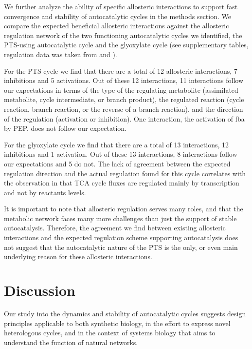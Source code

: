     We further analyze the ability of specific allosteric interactions to support fast convergence and stability of autocatalytic cycles in the methods section.
    We compare the expected beneficial allosteric interactions against the allosteric regulation network of the two functioning autocatalytic cycles we identified, the PTS-using autocatalytic cycle and the glyoxylate cycle (see supplementary tables, regulation data was taken from \cite{Keseler2013-xn} and \cite{Schomburg2004-st}).

    For the PTS cycle we find that there are a total of 12 allosteric interactions, 7 inhibitions and 5 activations.
    Out of these 12 interactions, 11 interactions follow our expectations in terms of the type of the regulating metabolite (assimilated metabolite, cycle intermediate, or branch product), the regulated reaction (cycle reaction, branch reaction, or the reverse of a branch reaction), and the direction of the regulation (activation or inhibition).
    One interaction, the activation of fba by PEP, does not follow our expectation.

    For the glyoxylate cycle we find that there are a total of 13 interactions, 12 inhibitions and 1 activation.
    Out of these 13 interactions, 8 interactions follow our expectations and 5 do not.
    The lack of agreement between the expected regulation direction and the actual regulation found for this cycle correlates with the observation in \cite{Gerosa2015-oq} that TCA cycle fluxes are regulated mainly by transcription and not by reactants levels.

    It is important to note that allosteric regulation serves many roles, and that the metabolic network faces many more challenges than just the support of stable autocatalysis.
    Therefore, the agreement we find between existing allosteric interactions and the expected regulation scheme supporting autocatalysis does not suggest that the autocatalytic nature of the PTS is the only, or even main underlying reason for these allosteric interactions.
\section{Discussion}
Our study into the dynamics and stability of autocatalytic cycles suggests design principles applicable to both synthetic biology, in the effort to express novel heterologous cycles, and in the context of systems biology that aims to understand the function of natural networks.

